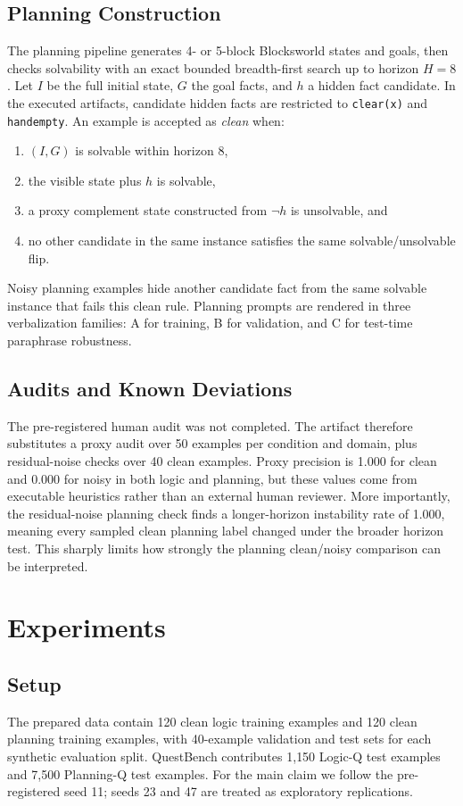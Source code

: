 \subsection{Planning Construction}
The planning pipeline generates 4- or 5-block Blocksworld states and goals, then checks solvability with an exact bounded breadth-first search up to horizon $H=8$. Let $I$ be the full initial state, $G$ the goal facts, and $h$ a hidden fact candidate. In the executed artifacts, candidate hidden facts are restricted to \texttt{clear(x)} and \texttt{handempty}. An example is accepted as \emph{clean} when:
\begin{enumerate}[leftmargin=*]
  \item $(I, G)$ is solvable within horizon 8,
  \item the visible state plus $h$ is solvable,
  \item a proxy complement state constructed from $\neg h$ is unsolvable, and
  \item no other candidate in the same instance satisfies the same solvable/unsolvable flip.
\end{enumerate}

Noisy planning examples hide another candidate fact from the same solvable instance that fails this clean rule. Planning prompts are rendered in three verbalization families: A for training, B for validation, and C for test-time paraphrase robustness.

\subsection{Audits and Known Deviations}
The pre-registered human audit was not completed. The artifact therefore substitutes a proxy audit over 50 examples per condition and domain, plus residual-noise checks over 40 clean examples. Proxy precision is 1.000 for clean and 0.000 for noisy in both logic and planning, but these values come from executable heuristics rather than an external human reviewer. More importantly, the residual-noise planning check finds a longer-horizon instability rate of 1.000, meaning every sampled clean planning label changed under the broader horizon test. This sharply limits how strongly the planning clean/noisy comparison can be interpreted.

\section{Experiments}
\label{sec:experiments}
\subsection{Setup}
The prepared data contain 120 clean logic training examples and 120 clean planning training examples, with 40-example validation and test sets for each synthetic evaluation split. QuestBench contributes 1{,}150 Logic-Q test examples and 7{,}500 Planning-Q test examples. For the main claim we follow the pre-registered seed 11; seeds 23 and 47 are treated as exploratory replications.

